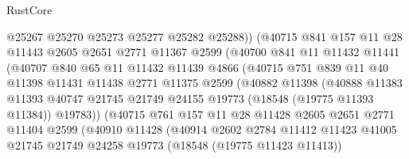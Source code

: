 \begin{lexlean}{RustCore}
\begin{coremodule}
                        @25267
                        @25270
                        @25273
                        @25277
                        @25282
                        @25288))
                    (@40715
                      @841
                      @157
                      @11
                      @28
                      @11443
                      @2605
                      @2651
                      @2771
                      @11367
                      @2599
                      (@40700
                        @841
                        @11
                        @11432
                        @11441
                        (@40707
                          @840
                          @65
                          @11
                          @11432
                          @11439
                          @4866
                          (@40715
                            @751
                            @839
                            @11
                            @40
                            @11398
                            @11431
                            @11438
                            @2771
                            @11375
                            @2599
                            (@40882
                              @11398
                              (@40888
                                @11383
                                @11393
                                @40747
                                @21745
                                @21749
                                @24155
                                @19773
                                (@18548 (@19775 @11393 @11384))
                                @19783))
                            (@40715
                              @761
                              @157
                              @11
                              @28
                              @11428
                              @2605
                              @2651
                              @2771
                              @11404
                              @2599
                              (@40910
                                @11428
                                (@40914
                                  @2602
                                  @2784
                                  @11412
                                  @11423
                                  @41005
                                  @21745
                                  @21749
                                  @24258
                                  @19773
                                  (@18548 (@19775 @11423 @11413))

\end{coremodule}
\end{lexlean}
